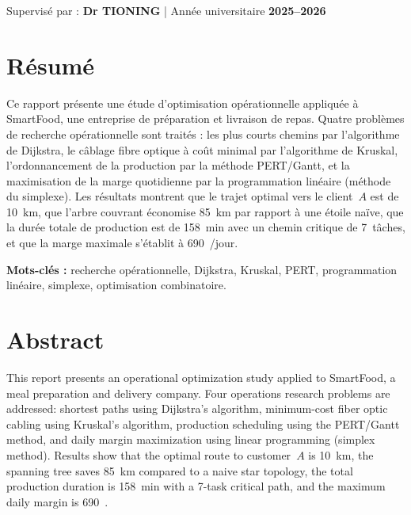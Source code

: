 \documentclass[12pt,a4paper]{article}
\begin{document}
\begin{titlepage}
\vfill
\begin{center}
  {\color{NavyDark}\small Supervisé par :
   \textbf{Dr TIONING}} \quad
  {\color{SlateMid}|} \quad
  {\color{NavyDark}\small Année universitaire \textbf{2025–2026}}
\end{center}
\vspace{0.6cm}

\end{titlepage}

\setcounter{page}{1}
\section*{Résumé}

Ce rapport présente une étude d'optimisation opérationnelle appliquée à SmartFood,
une entreprise de préparation et livraison de repas. Quatre problèmes de recherche
opérationnelle sont traités : les plus courts chemins par l'algorithme de Dijkstra,
le câblage fibre optique à coût minimal par l'algorithme de Kruskal, l'ordonnancement
de la production par la méthode PERT/Gantt, et la maximisation de la marge quotidienne
par la programmation linéaire (méthode du simplexe). Les résultats montrent que le
trajet optimal vers le client~$A$ est de 10~km, que l'arbre couvrant économise 85~km
par rapport à une étoile naïve, que la durée totale de production est de 158~min avec
un chemin critique de 7~tâches, et que la marge maximale s'établit à 690~\texteuro{}/jour.

\bigskip
\noindent\textbf{Mots-clés :} recherche opérationnelle, Dijkstra, Kruskal, PERT,
programmation linéaire, simplexe, optimisation combinatoire.

\newpage

\section*{Abstract}

This report presents an operational optimization study applied to SmartFood, a meal
preparation and delivery company. Four operations research problems are addressed:
shortest paths using Dijkstra's algorithm, minimum-cost fiber optic cabling using
Kruskal's algorithm, production scheduling using the PERT/Gantt method, and daily
margin maximization using linear programming (simplex method). Results show that the
optimal route to customer~$A$ is 10~km, the spanning tree saves 85~km compared to a
naive star topology, the total production duration is 158~min with a 7-task critical
path, and the maximum daily margin is 690~\texteuro{}.
\end{document}
